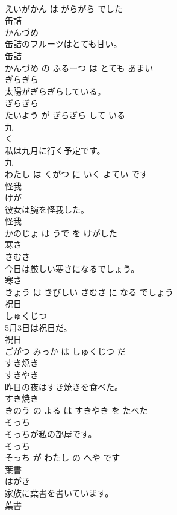 \documentclass[8pt]{extreport}
\begin{document}
\begin{CJK}{UTF8}{min}
\\	えいがかん は がらがら でした			
\\	缶詰	
\\	かんづめ			
\\	缶詰のフルーツはとても甘い。	
\\	缶詰 
\\	かんづめ の ふるーつ は とても あまい			
\\	ぎらぎら	
\\	太陽がぎらぎらしている。	
\\	ぎらぎら 
\\	たいよう が ぎらぎら して いる			
\\	九	
\\	く			
\\	私は九月に行く予定です。	
\\	九 
\\	わたし は くがつ に いく よてい です			
\\	怪我	
\\	けが			
\\	彼女は腕を怪我した。	
\\	怪我 
\\	かのじょ は うで を けがした			
\\	寒さ	
\\	さむさ			
\\	今日は厳しい寒さになるでしょう。	
\\	寒さ 
\\	きょう は きびしい さむさ に なる でしょう			
\\	祝日	
\\	しゅくじつ			
\\	5月3日は祝日だ。	
\\	祝日 
\\	ごがつ みっか は しゅくじつ だ			
\\	すき焼き	
\\	すきやき			
\\	昨日の夜はすき焼きを食べた。	
\\	すき焼き 
\\	きのう の よる は すきやき を たべた			
\\	そっち	
\\	そっちが私の部屋です。	
\\	そっち 
\\	そっち が わたし の へや です			
\\	葉書	
\\	はがき			
\\	家族に葉書を書いています。	
\\	葉書 

\end{CJK}
\end{document}
